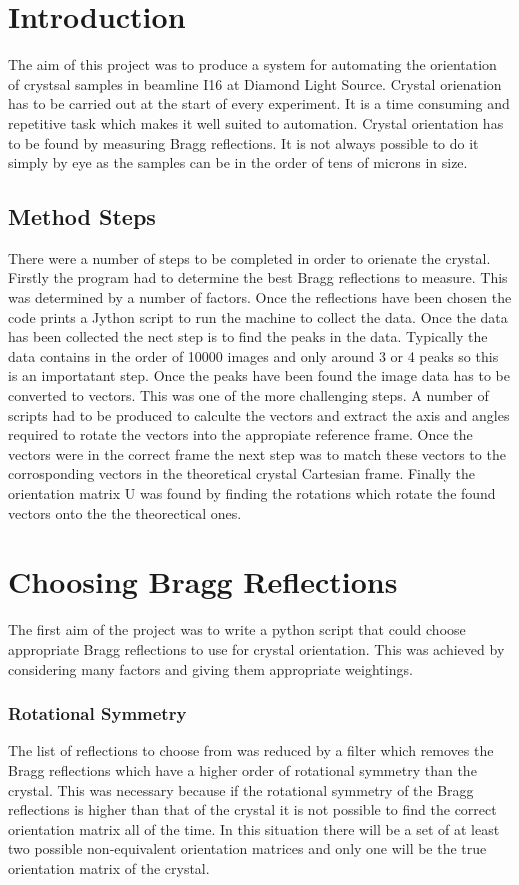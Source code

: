 \documentclass[10pt,a4paper]{article}
\begin{document}
\begin{multicols}{2}
\section*{Introduction}
The aim of this project was to produce a system for automating the orientation of crystsal samples in beamline I16 at Diamond Light Source. Crystal orienation has to be carried out at the start of every experiment. It is a time consuming and repetitive task which makes it well suited to automation. Crystal orientation has to be found by measuring Bragg reflections. It is not always possible to do it simply by eye as the samples can be in the order of tens of microns in size.

\subsection*{Method Steps}
There were a number of steps to be completed in order to orienate the crystal. Firstly the program had to determine the best Bragg reflections to measure. This was determined by a number of factors. Once the reflections have been chosen the code prints a Jython script to run the machine to collect the data. Once the data has been collected the nect step is to find the peaks in the data. Typically the data contains in the order of 10000 images and only around 3 or 4 peaks so this is an importatant step. Once the peaks have been found the image data has to be converted to vectors. This was one of the more challenging steps. A number of scripts had to be produced to calculte the vectors and extract the axis and angles required to rotate the vectors into the appropiate reference frame. Once the vectors were in the correct frame the next step was to match these vectors to the corrosponding vectors in the theoretical crystal Cartesian frame. Finally the orientation matrix U was found by finding the rotations which rotate the found vectors onto the the theorectical ones.

\section*{Choosing Bragg Reflections}
The first aim of the project was to write a python script that could choose appropriate Bragg reflections to use for crystal orientation. This was achieved 
by considering many factors and giving them appropriate weightings.
\subsubsection*{Rotational Symmetry}
The list of reflections to choose from was reduced by a filter which removes the Bragg reflections which have a higher order of rotational symmetry than the
 crystal. This was necessary because if the rotational symmetry of the Bragg reflections is higher than that of the crystal it is not possible to find 
 the correct orientation matrix all of the time. In this situation there will be a set of at least two possible non-equivalent orientation matrices and only
one will be the true orientation matrix of the crystal. 

\end{multicols}
\end{document}
